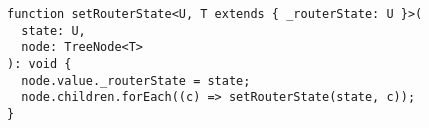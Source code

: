 \begin{verbatim}
function setRouterState<U, T extends { _routerState: U }>(
  state: U,
  node: TreeNode<T>
): void {
  node.value._routerState = state;
  node.children.forEach((c) => setRouterState(state, c));
}
\end{verbatim}
